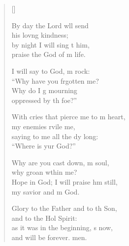 \begin{verse}[\versewidth]
\begin{patverse}
By day the Lord w\pointup{\i}ll send\Med\\
his lov\pointup{\i}ng kindness;\\
by night I will sing t him,\Med\\
praise the God of m life.

I will say to God, m rock:\Med\\
“Why have you frgotten me?\\
Why do I g mourning\Med\\
oppressed by th foe?”

With cries that pierce me to m heart,\Med\\
my enemies rvile me,\\
saying to me all the dy long:\Med\\
“Where is yur God?”

Why are you cast down, m soul,\Med\\
why groan w\pointup{\i}thin me?\\
Hope in God; I will praise h\pointup{\i}m still,\Med\\
my savior and m God.

Glory to the Father and to th Son,\Med\\
and to the Hol Spirit:\\
as it was in the beginning, \pointup{\i}s now,\Med\\
and will be forever. men. 
  \end{patverse}
\end{verse}
